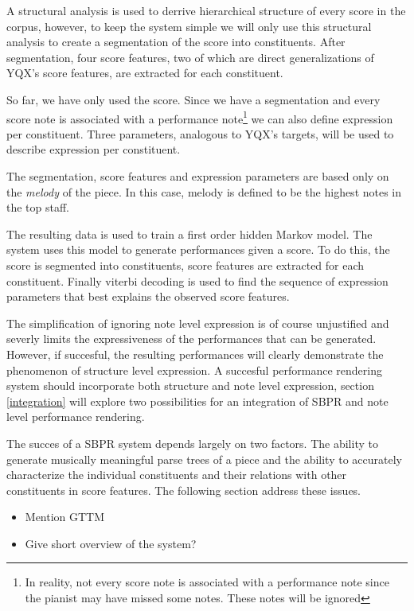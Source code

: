 \documentclass[a4paper,10pt]{article}
\begin{document}
A structural analysis is used to derrive hierarchical structure of every score in the corpus, however, to keep the system simple we will only use this structural analysis to create a segmentation of the score into constituents. After segmentation, four score features, two of which are direct generalizations of YQX's score features, are extracted for each constituent. 

So far, we have only used the score. Since we have a segmentation and every score note is associated with a performance note\footnote{In reality, not every score note is associated with a performance note since the pianist may have missed some notes. These notes will be ignored} we can also define expression per constituent. Three parameters, analogous to YQX's targets, will be used to describe expression per constituent.

The segmentation, score features and expression parameters are based only on the \textit{melody} of the piece. In this case, melody is defined to be the highest notes in the top staff.

The resulting data is used to train a first order hidden Markov model. The system uses this model to generate performances given a score. To do this, the score is segmented into constituents, score features are extracted for each constituent. Finally viterbi decoding is used to find the sequence of expression parameters that best explains the observed score features.

The simplification of ignoring note level expression is of course unjustified and severly limits the expressiveness of the performances that can be generated. However, if succesful, the resulting performances will clearly demonstrate the phenomenon of structure level expression. A succesful performance rendering system should incorporate both structure and note level expression, section \ref{integration} will explore two possibilities for an integration of SBPR and note level performance rendering.

The succes of a SBPR system depends largely on two factors. The ability to generate musically meaningful parse trees of a piece and the ability to accurately characterize the individual constituents and their relations with other constituents in score features. The following section address these issues. 

\begin{itemize}
\item Mention GTTM
\item Give short overview of the system?
\end{itemize}
\end{document}
